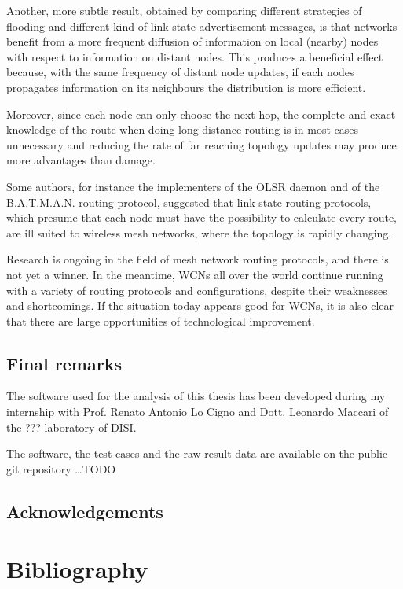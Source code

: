 \documentclass[a4paper,11pt,twoside,openleft]{memoir}
\begin{document}
Another, more subtle result, obtained by comparing different strategies of
flooding and different kind of link-state advertisement messages, is that
networks benefit from a more frequent diffusion of information on local (nearby)
nodes with respect to information on distant nodes. This produces a beneficial
effect because, with the same frequency of distant node updates, if each nodes
propagates information on its neighbours the distribution is more efficient.

Moreover, since each node can only choose the next hop, the complete and exact
knowledge of the route when doing long distance routing is in most cases
unnecessary and reducing the rate of far reaching topology updates may produce
more advantages than damage.

Some authors, for instance the implementers of the OLSR daemon and of the
B.A.T.M.A.N. routing protocol, suggested that link-state routing protocols,
which presume that each node must have the possibility to calculate every
route, are ill suited to wireless mesh networks, where the topology
is rapidly changing.

Research is ongoing in the field of mesh network routing protocols, and there
is not yet a winner. In the meantime, WCNs all over the world continue
running with a variety of routing protocols and configurations, despite their
weaknesses and shortcomings.
If the situation today appears good for WCNs, it is also clear that there are
large opportunities of technological improvement.

\section{Final remarks}\label{final-remarks}

The software used for the analysis of this thesis has been developed during
my internship with Prof. Renato Antonio Lo Cigno and Dott. Leonardo Maccari
of the ??? laboratory of DISI.

The software, the test cases and the raw result data are available on the public
git repository \dots TODO %

\section{Acknowledgements}\label{acknowledgements}

\chapter*{Bibliography}\label{bibliography}
\end{document}
